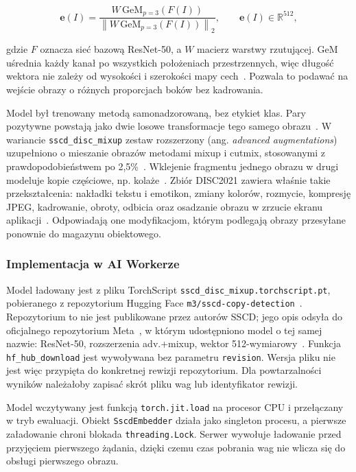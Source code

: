 \begin{equation}
\label{eq:sscd-forward}
\mathbf{e}(I)=
\frac{W\,\mathrm{GeM}_{p=3}\!\left(F(I)\right)}
{\left\|W\,\mathrm{GeM}_{p=3}\!\left(F(I)\right)\right\|_2},
\qquad \mathbf{e}(I)\in\mathbb{R}^{512},
\end{equation}

gdzie \(F\) oznacza sieć bazową ResNet-50, a \(W\) macierz warstwy
rzutującej. GeM uśrednia każdy kanał po wszystkich położeniach
przestrzennych, więc długość wektora nie zależy od wysokości i
szerokości mapy cech~\cite{radenovic2018gem}. Pozwala to podawać
na wejście obrazy o różnych proporcjach boków bez kadrowania.

Model był trenowany metodą samonadzorowaną, bez etykiet klas.
Pary pozytywne powstają jako dwie losowe transformacje tego samego
obrazu~\cite{chen2020simclr,pizzi2022sscd}. W wariancie
\texttt{sscd\_disc\_mixup} zestaw rozszerzony
(ang. \textit{advanced augmentations}) uzupełniono o mieszanie
obrazów metodami mixup i cutmix, stosowanymi z prawdopodobieństwem
po 2,5\%~\cite{pizzi2022sscd}. Wklejenie fragmentu jednego obrazu
w drugi modeluje kopie częściowe, np. kolaże~\cite{pizzi2022sscd}.
Zbiór DISC2021 zawiera właśnie takie przekształcenia: nakładki
tekstu i emotikon, zmiany kolorów, rozmycie, kompresję JPEG,
kadrowanie, obroty, odbicia oraz osadzanie obrazu w zrzucie ekranu
aplikacji~\cite{douze2021disc}. Odpowiadają one modyfikacjom,
którym podlegają obrazy przesyłane ponownie do magazynu obiektowego.

\subsubsection{Implementacja w AI Workerze}

Model ładowany jest z pliku TorchScript
\texttt{sscd\_disc\_mixup.torchscript.pt}, pobieranego z repozytorium
Hugging Face \texttt{m3/sscd-copy-detection}~\cite{hf_m3_sscd}.
Repozytorium to nie jest publikowane przez autorów SSCD; jego opis
odsyła do oficjalnego repozytorium Meta~\cite{hf_m3_sscd,sscd_repo},
w którym udostępniono model o tej samej nazwie: ResNet-50,
rozszerzenia adv.+mixup, wektor 512-wymiarowy~\cite{sscd_repo}.
Funkcja \texttt{hf\_hub\_download} jest wywoływana bez parametru
\texttt{revision}. Wersja pliku nie jest więc przypięta do konkretnej
rewizji repozytorium. Dla powtarzalności wyników należałoby zapisać
skrót pliku wag lub identyfikator rewizji.

Model wczytywany jest funkcją \texttt{torch.jit.load} na procesor CPU
i przełączany w tryb ewaluacji. Obiekt \texttt{SscdEmbedder} działa
jako singleton procesu, a pierwsze załadowanie chroni blokada
\texttt{threading.Lock}. Serwer wywołuje ładowanie przed przyjęciem
pierwszego żądania, dzięki czemu czas pobrania wag nie wlicza się
do obsługi pierwszego obrazu.


